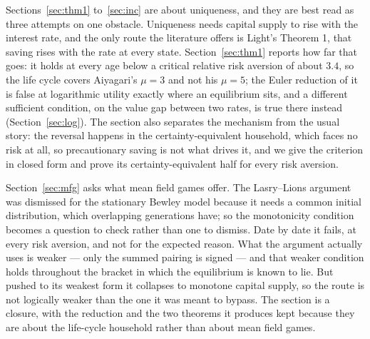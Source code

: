 Sections~\ref{sec:thm1} to~\ref{sec:inc} are about uniqueness, and they are best read as three
attempts on one obstacle. Uniqueness needs capital supply to rise with the interest rate, and the
only route the literature offers is Light's Theorem 1, that saving rises with the rate at every
state. Section~\ref{sec:thm1} reports how far that goes: it holds at every age below a critical
relative risk aversion of about $3.4$, so the life cycle covers Aiyagari's $\mu=3$ and not his
$\mu=5$; the Euler reduction of it is false at logarithmic utility exactly where an equilibrium sits,
and a different sufficient condition, on the value gap between two rates, is true there instead
(Section~\ref{sec:log}). The section also separates the mechanism from the usual story: the reversal
happens in the certainty-equivalent household, which faces no risk at all, so precautionary saving is
not what drives it, and we give the criterion in closed form and prove its certainty-equivalent half
for every risk aversion.

Section~\ref{sec:mfg} asks what mean field games offer. The Lasry--Lions argument was dismissed for
the stationary Bewley model because it needs a common initial distribution, which overlapping
generations have; so the monotonicity condition becomes a question to check rather than one to
dismiss. Date by date it fails, at every risk aversion, and not for the expected reason. What the
argument actually uses is weaker --- only the summed pairing is signed --- and that weaker condition
holds throughout the bracket in which the equilibrium is known to lie. But pushed to its weakest form
it collapses to monotone capital supply, so the route is not logically weaker than the one it was
meant to bypass. The section is a closure, with the reduction and the two theorems it produces kept
because they are about the life-cycle household rather than about mean field games.

